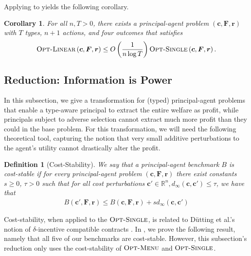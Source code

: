 \documentclass{article}
\newtheorem{definition}[theorem]{Definition}
\newtheorem{corollary}[theorem]{Corollary}
\newcommand{\dist}[3]{d_{#3}\left(#1, #2\right)}
\newcommand{\costvector}{\bm{c}}
\newcommand{\CostVector}{\bm{c}}
\newcommand{\ForecastTensor}{\bm{F}}
\newcommand{\rewardvector}{\bm{r}}
\newcommand{\RewardVector}{\bm{r}}
\newcommand{\PrincipalAgentProblem}{\left(\costvector, \ForecastTensor, \rewardvector\right)}
\newcommand{\Measure}{B}
\newcommand{\OMenu}{\textsc{Opt-Menu}}
\newcommand{\OSingle}{\textsc{Opt-Single}}
\newcommand{\OLinear}{\textsc{Opt-Linear}}
\newcommand{\dutting}{D{\"u}tting}
\begin{document}
Applying  to  yields the following corollary.

\begin{corollary}
\label{cor:nonlinearity-disparity}
For all $n, T > 0$, there exists a principal-agent problem $\PrincipalAgentProblem$ with $T$ types, $n+1$ actions, and four outcomes that satisfies
\begin{align*}
  \OLinear \PrincipalAgentProblem \le O\left( \frac{1}{n \log T} \right) \OSingle \PrincipalAgentProblem
  \text{.}
\end{align*}
\end{corollary}

\subsection{Reduction: Information is Power}
\label{subsec:info-is-power}

In this subsection, we give a transformation for (typed) principal-agent problems that enable a type-aware principal to extract the entire welfare as profit, while principals subject to adverse selection cannot extract much more profit than they could in the base problem. For this transformation, we will need the following theoretical tool, capturing the notion that very small additive perturbations to the agent's utility cannot drastically alter the profit.

\begin{definition}[Cost-Stability]
\label{def:cost-stability}
  We say that a principal-agent benchmark $\Measure$ is cost-stable if for every principal-agent problem $\PrincipalAgentProblem$ there exist constants $s \ge 0$, $\tau > 0$ such that for all cost perturbations $\CostVector' \in \mathbb{R}^n, \dist{\CostVector}{\CostVector'}{\infty} \le \tau$, we have that
  \begin{align*}
    \Measure(\CostVector', \ForecastTensor, \RewardVector) \le \Measure \PrincipalAgentProblem + s \dist{\CostVector}{\CostVector'}{\infty}
  \end{align*}
\end{definition}

Cost-stability, when applied to the $\OSingle$, is related to \dutting{} et al.'s notion of $\delta$-incentive compatible contracts \cite{dutting2020complexity}. In , we prove the following result, namely that all five of our benchmarks are cost-stable. However, this subsection's reduction only uses the cost-stability of $\OMenu$ and $\OSingle$. 
\end{document}
